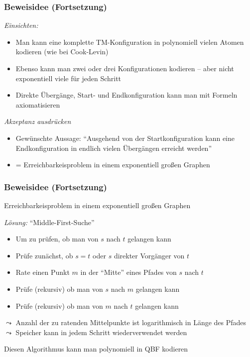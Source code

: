 \documentclass[aspectratio=1610,onlymath]{beamer}
\begin{document}
\begin{frame}\frametitle{Beweisidee (Fortsetzung)}

\emph{Einsichten:}
\begin{itemize}
\item Man kann eine komplette TM-Konfiguration in polynomiell vielen Atomen
  kodieren (wie bei Cook-Levin)
\item Ebenso kann man zwei oder drei Konfigurationen kodieren -- aber nicht exponentiell viele für jeden Schritt
\item Direkte Übergänge, Start- und Endkonfiguration kann man mit Formeln axiomatisieren
\end{itemize}\bigskip\pause

\emph{Akzeptanz ausdrücken}
\begin{itemize}
\item Gewünschte Aussage: "`Ausgehend von der Startkonfiguration kann eine Endkonfiguration in endlich vielen Übergängen erreicht werden"'
\item = Erreichbarkeisproblem in einem exponentiell großen Graphen
\end{itemize}


\end{frame}

\begin{frame}\frametitle{Beweisidee (Fortsetzung)}

\alert{Erreichbarkeisproblem in einem exponentiell großen Graphen}
\bigskip\pause

\emph{Lösung:} "`Middle-First-Suche"'
\begin{itemize}
\item Um zu prüfen, ob man von $s$ nach $t$ gelangen kann
\item Prüfe zunächst, ob $s=t$ oder $s$ direkter Vorgänger von $t$
\item Rate einen Punkt $m$ in der "`Mitte"' eines Pfades von $s$ nach $t$
\item Prüfe (rekursiv) ob man von $s$ nach $m$ gelangen kann
\item Prüfe (rekursiv) ob man von $m$ nach $t$ gelangen kann
\end{itemize}\pause
$\leadsto$ Anzahl der zu ratenden Mittelpunkte ist logarithmisch in Länge des Pfades\\
$\leadsto$ Speicher kann in jedem Schritt wiederverwendet werden
\bigskip

Diesen Algorithmus kann man polynomiell in QBF kodieren

\end{frame}
\end{document}
